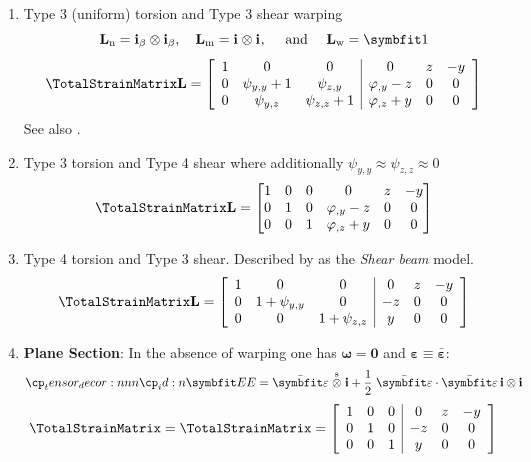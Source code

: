 \begin{enumerate}
\item Type 3 (uniform) torsion and Type 3 shear warping
$$
\mathbf{L}_{\mathrm{n}} = \FrameBasis_{\beta} \otimes \FrameBasis_{\beta}, \quad
\mathbf{L}_{\mathrm{m}} = \FrameBasis_{} \otimes \FrameBasis_{},
\quad\text{ and }\quad
\mathbf{L}_{\mathrm{w}} = \bm{1}
$$
$$
\TotalStrainMatrix\mathbf{L} = \left[\begin{array}{ccc|ccc}
1 & 0 & 0 & 0 & z & - y \\
0 & \psi_{y,y} + 1 & \psi_{z,y} & \varphi_{,y} - z & 0 & 0 \\
0 & \psi_{y,z} & \psi_{z,z} + 1 & \varphi_{,z} + y & 0 & 0
\end{array}\right]
$$
%
See also \cite{wackerfuss2009mixed}.

\item Type 3 torsion and Type 4 shear  \citep{gruttmann1998geometrical,battini2002corotational-thesis} where additionally \(\psi_{y,y}  \approx \psi_{z,z} \approx 0\)
$$
\TotalStrainMatrix\mathbf{L} = \left[\begin{matrix}
1 & 0 & 0 & 0 & z & - y \\
0 & 1 & 0 & \varphi_{,y} - z & 0 & 0 \\
0 & 0 & 1 & \varphi_{,z} + y & 0 & 0
\end{matrix}\right]
$$

\item Type 4 torsion and Type 3 shear. Described by \cite{lecorvec2012nonlinear} as the \emph{Shear beam} model.
$$
\TotalStrainMatrix\mathbf{L} = \left[\begin{array}{ccc|ccc}
1 & 0 & 0 & 0 & z & - y \\
0 & 1+\psi_{y,y} & 0 & - z & 0 & 0 \\
0 & 0 & 1+\psi_{z,z} &   y & 0 & 0
\end{array}\right]
$$
\item \textbf{Plane Section}: In the absence of warping one has $\bm{\omega}=\mathbf{0}$ and $\bm{\varepsilon}\equiv \bar{\bm{\varepsilon}}$:
$$
\StrainTensor = \bar{\bm{\varepsilon}}
\stackrel{\mathrm{s}}{\otimes}
\FrameBasis 
+ \frac{1}{2}\left.
\bar{\bm{\varepsilon}}\cdot\bar{\bm{\varepsilon}}\,\FrameBasis\otimes\FrameBasis\right. \\
$$
\begin{equation}
\TotalStrainMatrix = \TotalStrainMatrix = \left[\begin{array}{ccc|ccc}
1 & 0 & 0 & 0 & z & -y \\
0 & 1 & 0 & -z & 0 & 0 \\
0 & 0 & 1 &  y & 0 & 0 
\end{array}\right]
\end{equation}

\end{enumerate}
